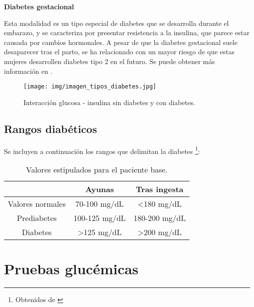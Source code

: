 \textbf{Diabetes gestacional}

Esta modalidad es un tipo especial de diabetes que se desarrolla durante el embarazo, y se caracteriza por presentar resistencia a la insulina, que parece estar causada por cambios hormonales. A pesar de que la diabetes gestacional suele desaparecer tras el parto, se ha relacionado con un mayor riesgo de que estas mujeres desarrollen diabetes tipo 2 en el futuro. Se puede obtener más información en  \cite{giarllarielli2023diabetes}.

\begin{figure}[h]
    \centering
    \texttt{[image: img/imagen\_tipos\_diabetes.jpg]}
    \caption{Interacción glucosa - insulina sin diabetes y con diabetes.}
    \label{fig:tipos_diabetes}
\end{figure}

\subsection{Rangos diabéticos}

Se incluyen a continuación los rangos que delimitan la diabetes \footnote{Obtenidos de \cite{mayoclinic_prediabetes}}: 

\begin{table}[htbp]
    \centering
    \caption{Valores estipulados para el paciente base.}
    \begin{tabular}{|c|c|c|}
        \hline
          & Ayunas & Tras ingesta  \\
        \hline
        Valores normales & 70-100 mg/dL & <180 mg/dL  \\
        Prediabetes & 100-125 mg/dL & 180-200 mg/dL \\
        Diabetes & >125 mg/dL & >200 mg/dL \\
        \hline
    \end{tabular}
    \label{tab:rangos_diabeticos}
\end{table}

\section{Pruebas glucémicas}

